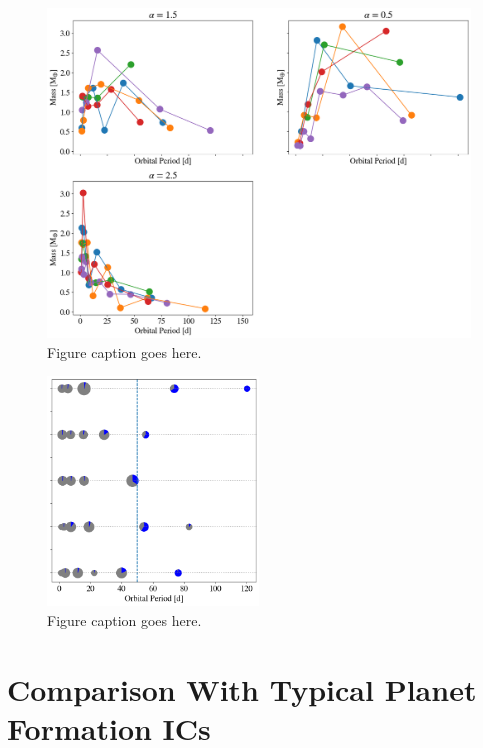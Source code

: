 \begin{figure}
\begin{center}
    \includegraphics[width=\textwidth]{figures/stip/per_mass_full.png}
    \caption{Figure caption goes here.\label{fig:per_mass_full}}
\end{center}
\end{figure}

\begin{figure}
\begin{center}
    \includegraphics[width=0.5\textwidth]{figures/stip/snowline.png}
    \caption{Figure caption goes here.\label{fig:snowline}}
\end{center}
\end{figure}

\section{Comparison With Typical Planet Formation ICs} \label{sec:typicalICs}

